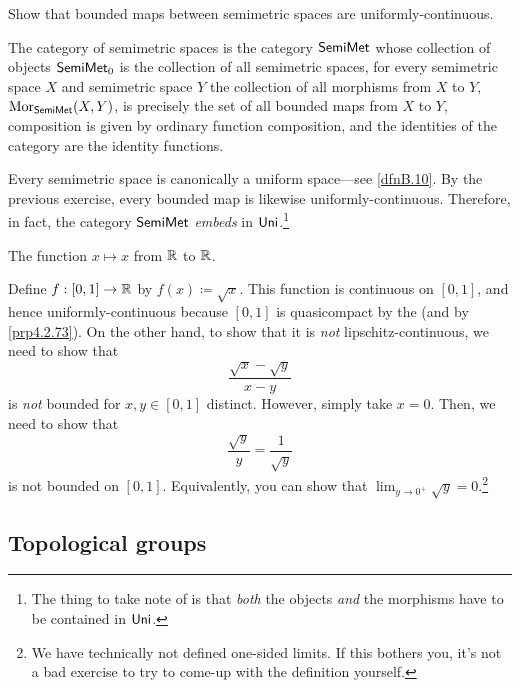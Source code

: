 \begin{exr}
Show that bounded maps between semimetric spaces are uniformly-continuous.
\end{exr}
\begin{exm}
The category of semimetric spaces is the category $\mathsf{Semi} \mathsf{Met}$ whose collection of objects $\mathsf{Semi} \mathsf{Met} _0$ is the collection of all semimetric spaces, for every semimetric space $X$ and semimetric space $Y$ the collection of all morphisms from $X$ to $Y$, $\operatorname{Mor} _{\mathsf{Semi} \mathsf{Met}}(X,Y)$, is precisely the set of all bounded maps from $X$ to $Y$, composition is given by ordinary function composition, and the identities of the category are the identity functions.
\begin{rmk}
Every semimetric space is canonically a uniform space---see \cref{dfnB.10}.  By the previous exercise, every bounded map is likewise uniformly-continuous.  Therefore, in fact, the category $\mathsf{Semi} \mathsf{Met}$ \emph{embeds} in $\mathsf{Uni}$.\footnote{The thing to take note of is that \emph{both} the objects \emph{and} the morphisms have to be contained in $\mathsf{Uni}$.}
\end{rmk}
\end{exm}
\begin{exm}
The function $x\mapsto x$ from $\mathbb{R}$ to $\mathbb{R}$.
\end{exm}
\begin{exm}\label{exm4.3.34}
Define $f:[0,1]\rightarrow \mathbb{R}$ by $f(x)\coloneqq \sqrt{x}$.  This function is continuous on $[0,1]$, and hence uniformly-continuous because $[0,1]$ is quasicompact by the  (and by \cref{prp4.2.73}).  On the other hand, to show that it is \emph{not} lipschitz-continuous, we need to show that
\begin{equation}
\frac{\sqrt{x}-\sqrt{y}}{x-y}
\end{equation}
is \emph{not} bounded for $x,y\in [0,1]$ distinct.  However, simply take $x=0$.  Then, we need to show that
\begin{equation}
\frac{\sqrt{y}}{y}=\frac{1}{\sqrt{y}}
\end{equation}
is not bounded on $[0,1]$.  Equivalently, you can show that $\lim _{y\to 0^+}\sqrt{y}=0$.\footnote{We have technically not defined one-sided limits.  If this bothers you, it's not a bad exercise to try to come-up with the definition yourself.}
\end{exm}

\subsection{Topological groups}

